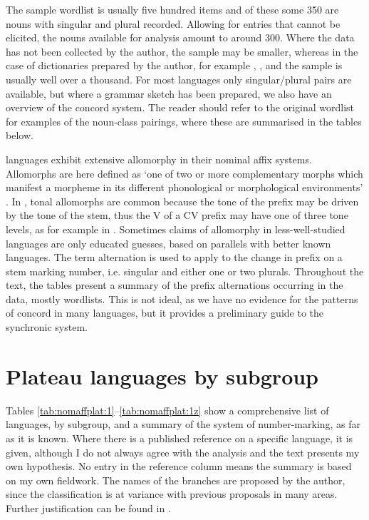 \documentclass[output=paper]{langsci/langscibook}
\begin{document}
\largerpage[-1]
The sample wordlist is usually five hundred items and of these some 350 are nouns with singular and plural recorded. Allowing for entries that cannot be elicited, the nouns available for analysis amount to around 300. Where the data has not been collected by the author, the sample may be smaller, whereas in the case of dictionaries prepared by the author, for example , ,  and  the sample is usually well over a thousand. For most languages only singular/plural pairs are available, but where a grammar sketch has been prepared, we also have an overview of the concord system. The reader should refer to the original wordlist for examples of the noun-class pairings, where these are summarised in the tables below.

 languages exhibit extensive allomorphy in their nominal affix systems. Allomorphs are here defined as ‘one of two or more complementary morphs which manifest a morpheme in its different phonological or morphological environments’ \citet{LoosEtAl2003}. In , tonal allomorphs are common because the tone of the prefix may be driven by the tone of the stem, thus the V of a CV prefix may have one of three tone levels, as for example in . Sometimes claims of allomorphy in less-well-studied languages are only educated guesses, based on parallels with better known languages. The term alternation is used to apply to the change in prefix on a stem marking number, i.e. singular and either one or two plurals. Throughout the text, the tables present a summary of the prefix alternations occurring in the data, mostly wordlists. This is not ideal, as we have no evidence for the patterns of concord in many languages, but it provides a preliminary guide to the synchronic system.

\section{Plateau languages by subgroup} %

Tables \ref{tab:nomaffplat:1}--\ref{tab:nomaffplat:1z} show a comprehensive list of  languages, by subgroup, and a summary of the system of number-marking, as far as it is known. Where there is a published reference on a specific language, it is given, although I do not always agree with the analysis and the text presents my own hypothesis. No entry in the reference column means the summary is based on my own fieldwork. The names of the branches are proposed by the author, since the classification is at variance with previous proposals in many areas. Further justification can be found in \citet{Blench2000wocal}.
\end{document}
